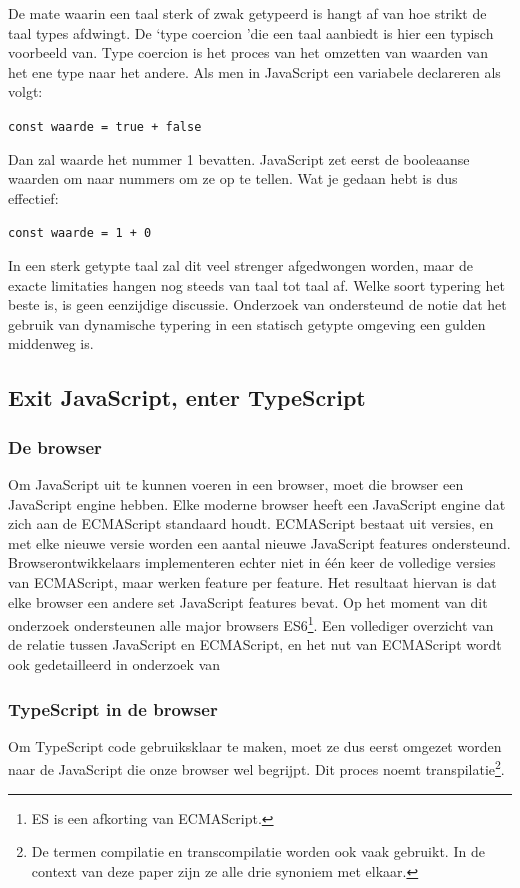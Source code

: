 De mate waarin een taal sterk of zwak getypeerd is hangt af van hoe strikt de taal types afdwingt. De \lq type coercion \rq die een taal aanbiedt is hier een typisch voorbeeld van. Type coercion is het proces van het omzetten van waarden van het ene type naar het andere. Als men in JavaScript een variabele declareren als volgt:

\verb|const waarde = true + false|

Dan zal waarde het nummer 1 bevatten. JavaScript zet eerst de booleaanse waarden om naar nummers om ze op te tellen. Wat je gedaan hebt is dus effectief:

\verb|const waarde = 1 + 0|

In een sterk getypte taal zal dit veel strenger afgedwongen worden, maar de exacte limitaties hangen nog steeds van taal tot taal af. Welke soort typering het beste is, is geen eenzijdige discussie. Onderzoek van \textcite{meijer_drayton_2004} ondersteund de notie dat het gebruik van dynamische typering in een statisch getypte omgeving een gulden middenweg is.

\subsection{Exit JavaScript, enter TypeScript}

\subsubsection{De browser}
Om JavaScript uit te kunnen voeren in een browser, moet die browser een JavaScript engine hebben. Elke moderne browser heeft een JavaScript engine dat zich aan de ECMAScript standaard houdt. ECMAScript bestaat uit versies, en met elke nieuwe versie worden een aantal nieuwe JavaScript features ondersteund. Browserontwikkelaars implementeren echter niet in één keer de volledige versies van ECMAScript, maar werken feature per feature. Het resultaat hiervan is dat elke browser een andere set JavaScript features bevat. Op het moment van dit onderzoek ondersteunen alle major browsers ES6\footnote{ES is een afkorting van ECMAScript.}. Een vollediger overzicht van de relatie tussen JavaScript en ECMAScript, en het nut van ECMAScript wordt ook gedetailleerd in onderzoek van \textcite{olund_karlsson_2016}

\subsubsection{TypeScript in de browser}
Om TypeScript code gebruiksklaar te maken, moet ze dus eerst omgezet worden naar de JavaScript die onze browser wel begrijpt. Dit proces noemt transpilatie\footnote{De termen compilatie en transcompilatie worden ook vaak gebruikt. In de context van deze paper zijn ze alle drie synoniem met elkaar.}.

